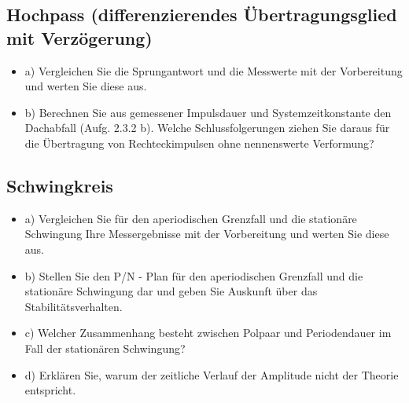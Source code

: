 \subsection{Hochpass (differenzierendes Übertragungsglied mit Verzögerung)}
\begin{itemize}
\item a) Vergleichen Sie die Sprungantwort und die Messwerte mit der Vorbereitung und werten Sie diese aus. 
\item b) Berechnen Sie aus gemessener Impulsdauer und Systemzeitkonstante den Dachabfall (Aufg. 2.3.2 b). Welche Schlussfolgerungen ziehen 
Sie daraus für die Übertragung von Rechteckimpulsen ohne nennenswerte Verformung?
\end{itemize}
\subsection{Schwingkreis}
\begin{itemize}
\item a) Vergleichen Sie für den aperiodischen Grenzfall und die stationäre Schwingung Ihre Messergebnisse mit der Vorbereitung und werten Sie diese aus. 
\item b) Stellen Sie den P/N - Plan für den aperiodischen Grenzfall und die stationäre Schwingung dar und geben Sie Auskunft über das Stabilitätsverhalten. 
\item c) Welcher Zusammenhang besteht zwischen Polpaar und Periodendauer im Fall der stationären Schwingung? 
\item d) Erklären Sie, warum der zeitliche Verlauf der Amplitude nicht der Theorie entspricht. 
\end{itemize}

